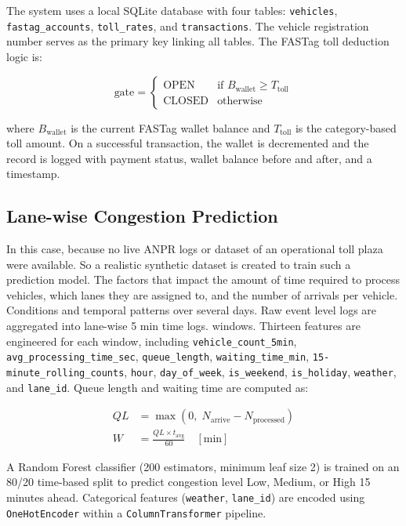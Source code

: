 \documentclass[conference]{IEEEtran}
\begin{document}
The system uses a local SQLite database with four tables:
\texttt{vehicles}, \texttt{fastag\_accounts},
\texttt{toll\_rates}, and \texttt{transactions}.
The vehicle registration number serves as the primary key linking
all tables.
The FASTag toll deduction logic is:

\begin{equation}
\text{gate} =
\begin{cases}
\text{OPEN}   & \text{if } B_{\text{wallet}} \geq T_{\text{toll}} \\
\text{CLOSED} & \text{otherwise}
\end{cases}
\label{eq:gate}
\end{equation}

where $B_{\text{wallet}}$ is the current FASTag wallet balance and
$T_{\text{toll}}$ is the category-based toll amount.
On a successful transaction, the wallet is decremented and the
record is logged with payment status, wallet balance before and
after, and a timestamp.

\subsection{Lane-wise Congestion Prediction}

In this case, because no live ANPR logs or dataset of an operational toll plaza were available. So a realistic synthetic dataset is created to train such a prediction model.
The factors that impact the amount of time required to process vehicles, which lanes they are assigned to, and the number of arrivals per vehicle.
Conditions and temporal patterns over several days.
Raw event level logs are aggregated into lane-wise 5 min time logs.
windows.
Thirteen features are engineered for each window, including
\texttt{vehicle\_count\_5min}, \texttt{avg\_processing\_time\_sec},
\texttt{queue\_length}, \texttt{waiting\_time\_min},
\texttt{15-minute\_rolling\_counts}, \texttt{hour}, \texttt{day\_of\_week},
\texttt{is\_weekend}, \texttt{is\_holiday}, \texttt{weather},
and \texttt{lane\_id}.
Queue length and waiting time are computed as:

\begin{align}
  QL  &= \max(0,\; N_{\text{arrive}} - N_{\text{processed}})
         \label{eq:ql} \\
  W   &= \frac{QL \times t_{\text{avg}}}{60} \quad [\text{min}]
         \label{eq:wait}
\end{align}

A Random Forest classifier (200 estimators, minimum leaf size 2)
is trained on an 80/20 time-based split to predict congestion
level Low, Medium, or High 15 minutes ahead.
Categorical features (\texttt{weather}, \texttt{lane\_id}) are
encoded using \texttt{OneHotEncoder} within a
\texttt{ColumnTransformer} pipeline.
\end{document}
